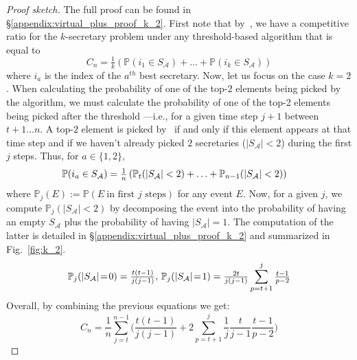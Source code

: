 \begin{proof}[Proof sketch]
The full proof can be found in \S\ref{appendix:virtual_plus_proof_k_2}. First note that by~\citep[Lem.~3.3]{albers2020new}, we have a competitive ratio for the $k$-secretary problem under any threshold-based algorithm that is equal to 
\begin{equation}
   C_n = \tfrac{1}{k}(\mathbb{P}(i_1 \in S_{\mathcal{A}}) + \ldots + \mathbb{P}(i_k \in S_{\mathcal{A}})) \label{eq:C_as_sum_prob}
\end{equation}
where $i_a$ is the index of the $a^{th}$ best secretary. 
Now, let us focus on the case $k=2$.
When calculating the probability of one of the top-$2$ elements being picked by the algorithm, we must calculate the probability of one of the top-2 elements being picked after the threshold ---i.e., for a given time step $j+1$ between $t+1 \dots n$. A top-$2$ element is picked by \algoname\ if and only if this element appears at that time step and if we haven't already picked $2$ secretaries ($|S_{\mathcal{A}}| < 2$) during the first $j$ steps. Thus, for $a \in \{1,2\}$,
\begin{align}
    \mathbb{P}(i_a \in S_{\mathcal{A}}) 
    &= \tfrac{1}{n}\left(\mathbb{P}_t(|S_{\mathcal{A}}| < 2) +\ldots+ \mathbb{P}_{n-1}(|S_{\mathcal{A}}| < 2)\right)\label{p_picked_equal_not_filled} \notag
\end{align}
where $\mathbb{P}_j(E):= \mathbb{P}(E \ \text{in first } j \text{ steps})$ for any event $E$.
Now, for a given $j$, we compute $\mathbb{P}_j(|S_{\mathcal{A}}| < 2)$ by decomposing the event into the probability of having an empty $S_{\mathcal{A}}$ plus the probability of having $|S_{\mathcal{A}}| = 1$. The computation of the latter is detailed in \S\ref{appendix:virtual_plus_proof_k_2} and summarized in Fig.~\ref{fig:k_2}.
\begin{align}
    \mathbb{P}_j(|S_{\mathcal{A}}| \!=\! 0)
    =  \tfrac{t(t - 1)}{j (j - 1)},\,
    \mathbb{P}_j(|S_{\mathcal{A}}| \!=\! 1)
    = \tfrac{2t}{j(j-1)} \sum_{p = t + 1}^{j}\tfrac{t-1}{p-2} \notag
\end{align}
Overall, by combining the previous equations we get:
\begin{equation}
    C_n = \frac{1}{n}\sum_{j=t}^{n-1}\Big( \frac{t(t - 1)}{j (j - 1)} + 2 \sum_{p = t + 1}^{j}\frac{1}{j}\frac{t}{j - 1}\frac{t-1}{p-2}\Big)

\end{equation}
\end{proof}
